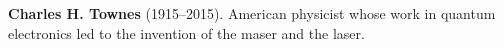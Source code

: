 \nobelphysics \textbf{Charles H. Townes} (1915–2015). American physicist whose work in quantum electronics led to the invention of the maser and the laser.

